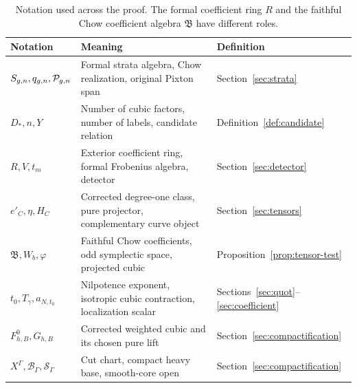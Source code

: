 \begin{table}[tb]
\centering
\small
\begin{tabular}{@{}p{}p{}p{}@{}}
\toprule
Notation & Meaning & Definition\\
\midrule
\(S_{g,n},q_{g,n},\mathcal P_{g,n}\) & Formal strata algebra, Chow realization, original Pixton span & Section~\ref{sec:strata}\\
\(D_*,n,Y\) & Number of cubic factors, number of labels, candidate relation & Definition~\ref{def:candidate}\\
\(R,V,t_m\) & Exterior coefficient ring, formal Frobenius algebra, detector & Section~\ref{sec:detector}\\
\(e'_C,\eta,H_C\) & Corrected degree-one class, pure projector, complementary curve object & Section~\ref{sec:tensors}\\
\(\mathfrak B,W_b,\varphi\) & Faithful Chow coefficients, odd symplectic space, projected cubic & Proposition~\ref{prop:tensor-test}\\
\(t_0,T_\gamma,a_{N,t_0}\) & Nilpotence exponent, isotropic cubic contraction, localization scalar & Sections~\ref{sec:quot}--\ref{sec:coefficient}\\
\(F^0_{h,B},G_{h,B}\) & Corrected weighted cubic and its chosen pure lift & Section~\ref{sec:compactification}\\
\(X^\Gamma,\mathcal B_\Gamma,\mathcal S_\Gamma\) & Cut chart, compact heavy base, smooth-core open & Section~\ref{sec:compactification}\\
\bottomrule
\end{tabular}
\caption{Notation used across the proof. The formal coefficient ring
\(R\) and the faithful Chow coefficient algebra \(\mathfrak B\) have
different roles.}
\label{tab:notation}
\end{table}
